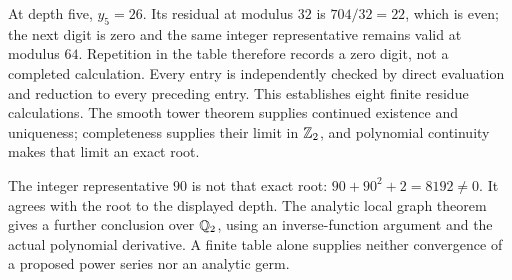 At depth five, $y_5=26$. Its residual at modulus $32$ is $704/32=22$, which is even; the next digit is zero and the same integer representative remains valid at modulus $64$. Repetition in the table therefore records a zero digit, not a completed calculation.
Every entry is independently checked by direct evaluation and reduction to every preceding entry. This establishes eight finite residue calculations. The smooth tower theorem supplies continued existence and uniqueness; completeness supplies their limit in $\mathbb Z_2$, and polynomial continuity makes that limit an exact root.

The integer representative $90$ is not that exact root: $90+90^2+2=8192\ne0$. It agrees with the root to the displayed depth. The analytic local graph theorem gives a further conclusion over $\mathbb Q_2$, using an inverse-function argument and the actual polynomial derivative. A finite table alone supplies neither convergence of a proposed power series nor an analytic germ.
